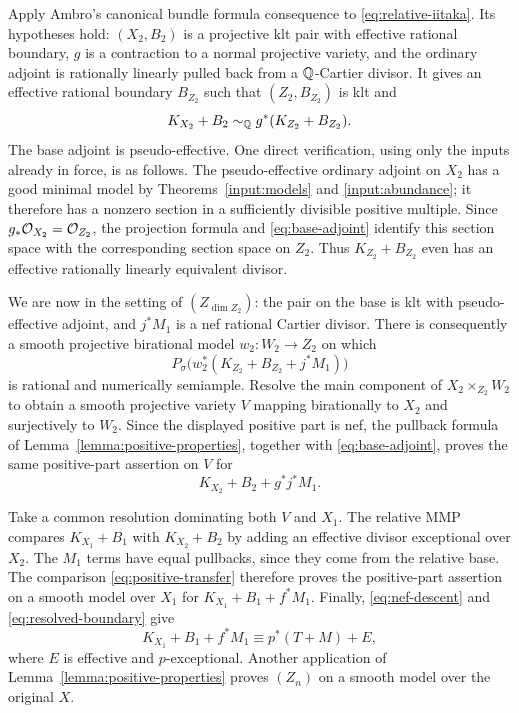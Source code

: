 Apply Ambro's canonical bundle formula consequence
\cite[Theorem 0.2]{Ambro} to \eqref{eq:relative-iitaka}.  Its
hypotheses hold: $(X_2,B_2)$ is a projective klt pair with effective
rational boundary, $g$ is a contraction to a normal projective
variety, and the ordinary adjoint is rationally linearly pulled back
from a $\mathbb Q$-Cartier divisor.  It gives an effective rational boundary
$B_{Z_2}$ such that $(Z_2,B_{Z_2})$ is klt and
\begin{equation}\label{eq:base-adjoint}
              K_{X_2}+B_2\sim_\mathbb Q g^*(K_{Z_2}+B_{Z_2}).
\end{equation}
The base adjoint is pseudo-effective.  One direct verification,
using only the inputs already in force, is as follows.  The
pseudo-effective ordinary adjoint on $X_2$ has a good minimal model
by Theorems~\ref{input:models} and \ref{input:abundance}; it therefore
has a nonzero section in a sufficiently divisible positive multiple.
Since $g_*\mathcal O_{X_2}=\mathcal O_{Z_2}$, the projection formula and
\eqref{eq:base-adjoint} identify this section space with the
corresponding section space on $Z_2$.  Thus $K_{Z_2}+B_{Z_2}$ even
has an effective rationally linearly equivalent divisor.

We are now in the setting of $(Z_{\dim Z_2})$: the pair on the base
is klt with pseudo-effective adjoint, and $j^*M_1$ is a nef rational
Cartier divisor.  There is consequently a smooth projective
birational model $w_2\colon W_2\to Z_2$ on which
\[
                 P_\sigma\bigl(w_2^*(K_{Z_2}+B_{Z_2}+j^*M_1)\bigr)
\]
is rational and numerically semiample.  Resolve the main component
of $X_2\times_{Z_2}W_2$ to obtain a smooth projective variety $V$
mapping birationally to $X_2$ and surjectively to $W_2$.  Since the
displayed positive part is nef, the pullback formula of
Lemma~\ref{lemma:positive-properties}, together with
\eqref{eq:base-adjoint}, proves the same positive-part assertion on
$V$ for
\[
                         K_{X_2}+B_2+g^*j^*M_1.
\]

Take a common resolution dominating both $V$ and $X_1$.  The
relative MMP compares $K_{X_1}+B_1$ with $K_{X_2}+B_2$ by adding
an effective divisor exceptional over $X_2$.  The $M_1$ terms have
equal pullbacks, since they come from the relative base.  The
comparison \eqref{eq:positive-transfer} therefore proves the
positive-part assertion on a smooth model over $X_1$ for
$K_{X_1}+B_1+f^*M_1$.  Finally,
\eqref{eq:nef-descent} and \eqref{eq:resolved-boundary} give
\[
                 K_{X_1}+B_1+f^*M_1\equiv p^*(T+M)+E,
\]
where $E$ is effective and $p$-exceptional.  Another application of
Lemma~\ref{lemma:positive-properties} proves $(Z_n)$ on a smooth
model over the original $X$.

